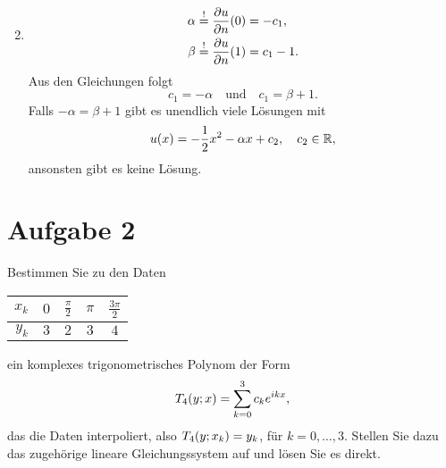 \documentclass{exercise}
\begin{document}
\begin{enumerate}
\[        \]
        \item
        \begin{align*}
            \alpha &\stackrel{!}{=} \frac{\partial u}{\partial n}\parentheses*{0} = -c_1,\\
            \beta &\stackrel{!}{=} \frac{\partial u}{\partial n}\parentheses*{1} = c_1 - 1.
        \end{align*}
        Aus den Gleichungen folgt
        \[
            c_1 = -\alpha \quad \text{und} \quad c_1 = \beta + 1.
        \]
        Falls \(-\alpha = \beta + 1\) gibt es unendlich viele Lösungen mit
        \[
            u\parentheses*{x} = -\frac{1}{2}x^2 - \alpha x + c_2, \quad c_2 \in \R,
        \]
        ansonsten gibt es keine Lösung.
    \end{enumerate}


    \section*{Aufgabe 2}

    \begin{problem}
        Bestimmen Sie zu den Daten
        \begin{center}
            \begin{tabular}{rcccc}
                \toprule
                \(x_k\) & \(0\) & \(\frac{\pi}{2}\) & \(\pi\) & \(\frac{3\pi}{2}\)\\
                \midrule
                \(y_k\) & \(3\) & \(2\) & \(3\) & \(4\)\\
                \bottomrule
            \end{tabular}
        \end{center}
        ein komplexes trigonometrisches Polynom der Form
        \[
            T_4\parentheses*{y; x} = \sum_{k = 0}^3 c_k e^{ikx},
        \]
        das die Daten interpoliert, also \(T_4\parentheses*{y; x_k} = y_k\), für \(k = 0, \ldots, 3\).
        Stellen Sie dazu das zugehörige lineare Gleichungssystem auf und lösen Sie es direkt.
    \end{problem}
\end{document}
